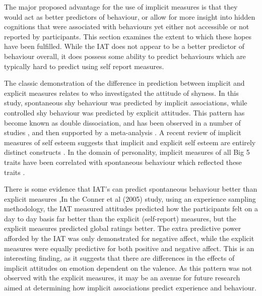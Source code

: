 The major proposed advantage for the use of implicit measures is that they would act as better predictors of behaviour, or allow for more insight into hidden cognitions that were associated with behaviours yet either not accessible or not reported by participants. This section examines the extent to which these hopes have been fulfilled. While the IAT does not appear to be a better predictor of behaviour overall, it does possess some ability to predict behaviours which are typically hard to predict using self report measures. 

The classic demonstration of the difference in prediction between implicit and explicit measures relates to \cite{Asendorpf2002} who investigated the attitude of shyness. In this study, spontaneous shy behaviour was predicted by implicit associations, while controlled shy behaviour was predicted by explicit attitudes. This pattern has become known as double dissociation, and has been observed in a number of studies \cite{Perugini2005}, and  then supported by  a meta-analysis \cite{Hofmann2005}. A recent review of implicit measures of self esteem suggests that implicit and explicit self esteem are entirely distinct constructs \cite{Rudolph2008} . In the domain of personality, implicit measures of all Big 5 traits have been correlated with spontaneous behaviour which reflected these traits \cite{Steffens2006}.

There is some evidence that IAT's can predict spontaneous behaviour better than explicit measures \cite{Conner2005,Perugini2005,Grumm2007} ,In the Conner et al (2005) study, using an experience sampling methodology, the IAT measured attitudes predicted how the participants felt on a day to day basis far better than the explicit (self-report) measures, but the explicit measures predicted global ratings better. The extra predictive power afforded by the IAT  was only demonstrated for negative affect,  while the explicit measures were equally predictive for both positive and negative affect.  This is an interesting finding, as it suggests that there are differences in the effects of implicit attitudes on emotion dependent on the valence. As this pattern was not observed with the explicit measures, it may be an avenue for future research aimed at determining how implicit associations predict experience and behaviour. 


